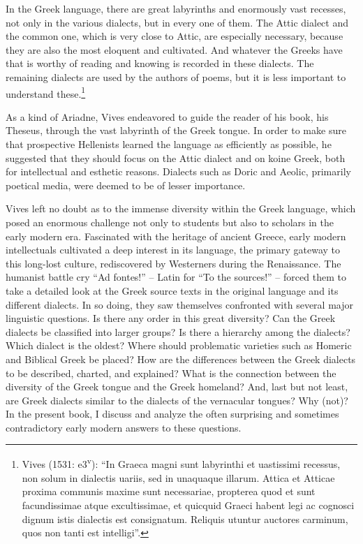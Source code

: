 \documentclass[12pt]{article}
\newenvironment{styleStandard}{\renewcommand\baselinestretch{1.25}\setlength\leftskip{0in}\setlength\rightskip{0in}\setlength\parindent{0.1972in}\setlength\parfillskip{0pt plus 1fil}\setlength\parskip{0in plus 1pt}\writerlistparindent\writerlistleftskip\leavevmode\normalfont\normalsize\writerlistlabel\ignorespaces}{\unskip\vspace{0in plus 1pt}\par}
\newenvironment{styleQuote}{\renewcommand\baselinestretch{1.25}\setlength\leftskip{0.3937in}\setlength\rightskip{0in}\setlength\parindent{0in}\setlength\parfillskip{0pt plus 1fil}\setlength\parskip{0.1665in plus 0.016649999in}\writerlistparindent\writerlistleftskip\leavevmode\normalfont\normalsize\writerlistlabel\ignorespaces}{\unskip\vspace{0.1665in plus 0.016649999in}\par}
\newcommand\writerlistleftskip{}
\newcommand\writerlistparindent{}
\newcommand\writerlistlabel{}
\begin{document}
\begin{styleQuote}
In the Greek language, there are great labyrinths and enormously vast recesses, not only in the various dialects, but in every one of them. The Attic dialect and the common one, which is very close to Attic, are especially necessary, because they are also the most eloquent and cultivated. And whatever the Greeks have that is worthy of reading and knowing is recorded in these dialects. The remaining dialects are used by the authors of poems, but it is less important to understand these.\footnote{ Vives (1531: e3\textsuperscript{v}): “In Graeca magni sunt labyrinthi et uastissimi recessus, non solum in dialectis uariis, sed in unaquaque illarum. Attica et Atticae proxima communis maxime sunt necessariae, propterea quod et sunt facundissimae atque excultissimae, et quicquid Graeci habent legi ac cognosci dignum istis dialectis est consignatum. Reliquis utuntur auctores carminum, quos non tanti est intelligi”.}
\end{styleQuote}

\begin{styleStandard}
As a kind of Ariadne, Vives endeavored to guide the reader of his book, his Theseus, through the vast labyrinth of the Greek tongue. In order to make sure that prospective Hellenists learned the language as efficiently as possible, he suggested that they should focus on the Attic dialect and on koine Greek, both for intellectual and esthetic reasons. Dialects such as Doric and Aeolic, primarily poetical media, were deemed to be of lesser importance.
\end{styleStandard}

\begin{styleStandard}
Vives left no doubt as to the immense diversity within the Greek language, which posed an enormous challenge not only to students but also to scholars in the early modern era. Fascinated with the heritage of ancient Greece, early modern intellectuals cultivated a deep interest in its language, the primary gateway to this long-lost culture, rediscovered by Westerners during the Renaissance. The humanist battle cry “Ad fontes!” – Latin for “To the sources!” – forced them to take a detailed look at the Greek source texts in the original language and its different dialects. In so doing, they saw themselves confronted with several major linguistic questions. Is there any order in this great diversity? Can the Greek dialects be classified into larger groups? Is there a hierarchy among the dialects? Which dialect is the oldest? Where should problematic varieties such as Homeric and Biblical Greek be placed? How are the differences between the Greek dialects to be described, charted, and explained? What is the connection between the diversity of the Greek tongue and the Greek homeland? And, last but not least, are Greek dialects similar to the dialects of the vernacular tongues? Why (not)? In the present book, I discuss and analyze the often surprising and sometimes contradictory early modern answers to these questions.
\end{styleStandard}
\end{document}

